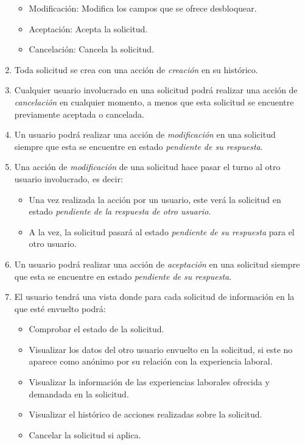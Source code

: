 \documentclass[a4paper, 12pt]{book}
\begin{document}
\begin{enumerate}
\begin{itemize}
            \item Modificación: Modifica los campos que se ofrece desbloquear.
            \item Aceptación: Acepta la solicitud.
            \item Cancelación: Cancela la solicitud.
        \end{itemize}
        \item Toda solicitud se crea con una acción de \emph{creación} en su histórico.
        \item Cualquier usuario involucrado en una solicitud podrá realizar una acción de \emph{cancelación} en cualquier momento, a menos que esta solicitud se encuentre previamente aceptada o cancelada.
        \item Un usuario podrá realizar una acción de \emph{modificación} en una solicitud siempre que esta se encuentre en estado \emph{pendiente de su respuesta}.
        \item Una acción de \emph{modificación} de una solicitud hace pasar el turno al otro usuario involucrado, es decir:
        \begin{itemize}
            \item Una vez realizada la acción por un usuario, este verá la solicitud en estado \emph{pendiente de la respuesta de otro usuario}.
            \item A la vez, la solicitud pasará al estado \emph{pendiente de su respuesta} para el otro usuario.
        \end{itemize}
        \item Un usuario podrá realizar una acción de \emph{aceptación} en una solicitud siempre que esta se encuentre en estado \emph{pendiente de su respuesta}.
        \item El usuario tendrá una vista donde para cada solicitud de información en la que esté envuelto podrá:
        \begin{itemize}
            \item Comprobar el estado de la solicitud.
            \item Visualizar los datos del otro usuario envuelto en la solicitud, si este no aparece como anónimo por su relación con la experiencia laboral.
            \item Visualizar la información de las experiencias laborales ofrecida y demandada en la solicitud.
            \item Visualizar el histórico de acciones realizadas sobre la solicitud.
            \item Cancelar la solicitud si aplica.

\end{itemize}
\end{enumerate}
\end{document}
